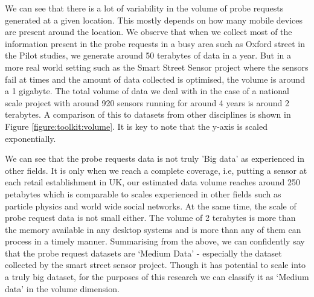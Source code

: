 
We can see that there is a lot of variability in the volume of probe requests generated at a given location.
This mostly depends on how many mobile devices are present around the location.
We observe that when we collect most of the information present in the probe requests in a busy area such as Oxford street in the Pilot studies, we generate around 50 terabytes of data in a year.
But in a more real world setting such as the Smart Street Sensor project where the sensors fail at times and the amount of data collected is optimised, the volume is around a 1 gigabyte.
The total volume of data we deal with in the case of a national scale project with around 920 sensors running for around 4 years is around 2 terabytes.
A comparison of this to datasets from other disciplines is shown in Figure \ref{figure:toolkit:volume}.
It is key to note that the y-axis is scaled exponentially.

We can see that the probe requests data is not truly 'Big data' as experienced in other fields.
It is only when we reach a complete coverage, i.e, putting a sensor at each retail establishment in UK, our estimated data volume reaches around 250 petabytes which is comparable to scales experienced in other fields such as particle physics and world wide social networks.
At the same time, the scale of probe request data is not small either.
The volume of 2 terabytes is more than the memory available in any desktop systems and is more than any of them can process in a timely manner.
Summarising from the above, we can confidently say that the probe request datasets are `Medium Data' - especially the dataset collected by the smart street sensor project.
Though it has potential to scale into a truly big dataset, for the purposes of this research we can classify it as `Medium data' in the volume dimension.

